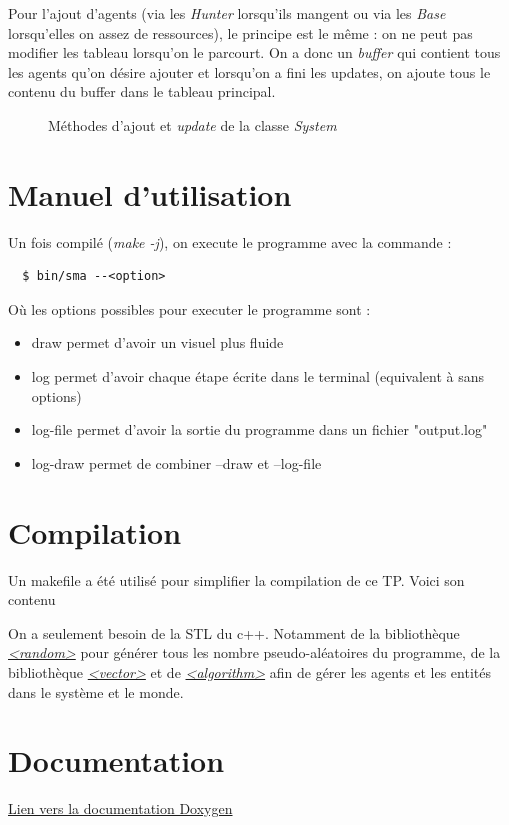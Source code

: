 \documentclass{article}
\newcommand{\changeurlcolor}[1]{\hypersetup{urlcolor=#1}}
\begin{document}
Pour l'ajout d'agents (via les \emph{Hunter} lorsqu'ils mangent ou via les \emph{Base} lorsqu'elles on assez de ressources), le principe
est le même : on ne peut pas modifier les tableau lorsqu'on le parcourt. On a donc un \emph{buffer} qui contient tous les agents qu'on
désire ajouter et lorsqu'on a fini les updates, on ajoute tous le contenu du buffer dans le tableau principal.

\newpage
\begin{figure}[!h]
  \centering
  \caption{Méthodes d'ajout et \emph{update} de la classe \emph{System}}
  
\end{figure}

\newpage
\appendix
\section{Manuel d'utilisation}
Un fois compilé (\emph{make -j}), on execute le programme avec la commande :
\begin{lstlisting}
  $ bin/sma --<option>
\end{lstlisting}
Où les options possibles pour executer le programme sont :
\begin{itemize}
  \item draw permet d'avoir un visuel plus fluide
  \item log permet d'avoir chaque étape écrite dans le terminal (equivalent à sans options)
  \item log-file permet d'avoir la sortie du programme dans un fichier "output.log"
  \item log-draw permet de combiner --draw et --log-file
\end{itemize}

\section{Compilation}
Un makefile a été utilisé pour simplifier la compilation de ce TP. Voici son contenu


On a seulement besoin de la STL du c++. Notamment de la bibliothèque \href{https://en.cppreference.com/w/cpp/numeric/random}{\emph{<random>}}
pour générer tous les nombre pseudo-aléatoires du programme, de la bibliothèque \href{https://en.cppreference.com/w/cpp/container/vector}{\emph{<vector>}}
et de \href{https://en.cppreference.com/w/cpp/algorithm}{\emph{<algorithm>}} afin de gérer les agents et les entités dans le système et le monde.

\section{Documentation}
\changeurlcolor{blue}\href{run:../Documentation/latex/refman.pdf}{Lien vers la documentation Doxygen}
\end{document}

